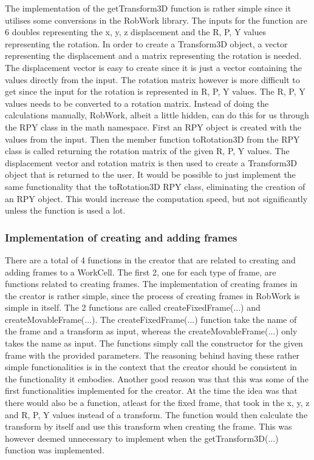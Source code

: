 The implementation of the getTransform3D function is rather simple since it utilises some conversions in the RobWork library. The inputs for the function are 6 doubles representing the x, y, z displacement and the R, P, Y values representing the rotation. In order to create a Transform3D object, a vector representing the displacement and a matrix representing the rotation is needed. The displacement vector is easy to create since it is just a vector containing the values directly from the input. The rotation matrix however is more difficult to get since the input for the rotation is represented in R, P, Y values. The R, P, Y values needs to be converted to a rotation matrix. Instead of doing the calculations manually, RobWork, albeit a little hidden, can do this for us through the RPY class in the math namespace. First an RPY object is created with the values from the input. Then the member function toRotation3D from the RPY class is called returning the rotation matrix of the given R, P, Y values. The displacement vector and rotation matrix is then used to create a Transform3D object that is returned to the user. It would be possible to just implement the same functionality that the toRotation3D RPY class, eliminating the creation of an RPY object. This would increase the computation speed, but not significantly unless the function is used a lot.

\subsubsection{Implementation of creating and adding frames}
There are a total of 4 functions in the creator that are related to creating and adding frames to a WorkCell. The first 2, one for each type of frame, are functions related to creating frames. The implementation of creating frames in the creator is rather simple, since the process of creating frames in RobWork is simple in itself. The 2 functions are called createFixedFrame(...) and createMovableFrame(...). The createFixedFrame(...) function take the name of the frame and a transform as input, whereas the createMovableFrame(...) only takes the name as input. The functions simply call the constructor for the given frame with the provided parameters. The reasoning behind having these rather simple functionalities is in the context that the creator should be consistent in the functionality it embodies. Another good reason was that this was some of the first functionalities implemented for the creator. At the time the idea was that there would also be a function, atleast for the fixed frame, that took in the x, y, z and R, P, Y values instead of a transform. The function would then calculate the transform by itself and use this transform when creating the frame. This was however deemed unnecessary to implement when the getTransform3D(...) function was implemented.\\

